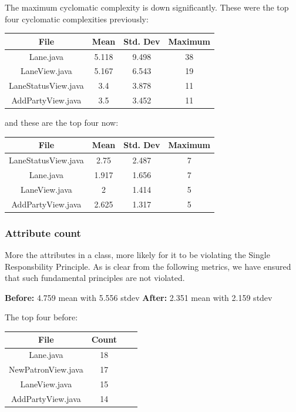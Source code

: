 The maximum cyclomatic complexity is down significantly. These were the top four cyclomatic complexities previously:

\begin{tabular}{ |c|c|c|c| }
    \hline
    \textbf{File}       & \textbf{Mean} & \textbf{Std. Dev} & \textbf{Maximum} \\
    \hline
    Lane.java           & 5.118         & 9.498             & 38               \\
    LaneView.java       & 5.167         & 6.543             & 19               \\
    LaneStatusView.java & 3.4           & 3.878             & 11               \\
    AddPartyView.java   & 3.5           & 3.452             & 11               \\
    \hline
\end{tabular}

and these are the top four now:

\begin{tabular}{ |c|c|c|c| }
    \hline
    \textbf{File}       & \textbf{Mean} & \textbf{Std. Dev} & \textbf{Maximum} \\
    \hline
    LaneStatusView.java & 2.75          & 2.487             & 7                \\
    Lane.java           & 1.917         & 1.656             & 7                \\
    LaneView.java       & 2             & 1.414             & 5                \\
    AddPartyView.java   & 2.625         & 1.317             & 5                \\
    \hline
\end{tabular}


\subsubsection{Attribute count}

More the attributes in a class, more likely for it to be violating the Single Responsbility Principle. As is clear from the following metrics, we have ensured that such fundamental principles are not violated.


\textbf{Before:} 4.759 mean with 5.556 stdev
\textbf{After:} 2.351 mean with 2.159 stdev

The top four before:

\begin{tabular}{ |c|c|c|c| }
    \hline
    \textbf{File}       & \textbf{Count} \\
    \hline
    Lane.java           & 18 \\
    NewPatronView.java  & 17 \\
    LaneView.java       & 15 \\
    AddPartyView.java   & 14 \\
    \hline
\end{tabular}

